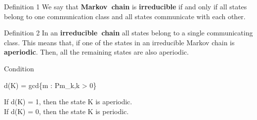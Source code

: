 \documentclass{beamer}
\begin{document}
\begin{frame}{}
\begin{block}{Definition 1}
We say that \textbf{Markov\ chain} is \textbf{irreducible} if and only if all states belong to one communication class and all states communicate with each other.
\end{block}
\begin{block}{Definition 2}
In an \textbf{irreducible\ chain} all states belong to a single communicating class. This means that, if one of the states in an irreducible Markov chain is \textbf{aperiodic}. Then, all the remaining states are also aperiodic. 
\end{block}
\begin{block}{Condition}
\begin{center}
    d(K) = gcd\{m : P{m}_{k,k} > 0\} \\
\end{center} 
If d(K) = 1, then the state K is aperiodic. \\
If d(K) = 0, then the state K is periodic.    
\end{block}
\end{frame}
\end{document}
